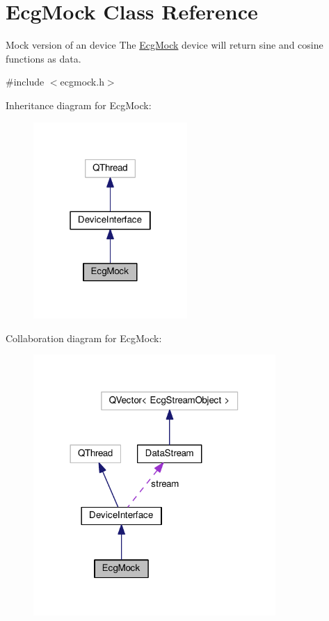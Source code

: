 \hypertarget{classEcgMock}{}\section{Ecg\+Mock Class Reference}
\label{classEcgMock}


Mock version of an device The \hyperlink{classEcgMock}{Ecg\+Mock} device will return sine and cosine functions as data.  




{\ttfamily \#include $<$ecgmock.\+h$>$}



Inheritance diagram for Ecg\+Mock\+:\nopagebreak
\begin{figure}[H]
\begin{center}
\leavevmode
\includegraphics[width=166pt]{classEcgMock__inherit__graph}
\end{center}
\end{figure}


Collaboration diagram for Ecg\+Mock\+:\nopagebreak
\begin{figure}[H]
\begin{center}
\leavevmode
\includegraphics[width=261pt]{classEcgMock__coll__graph}
\end{center}
\end{figure}
